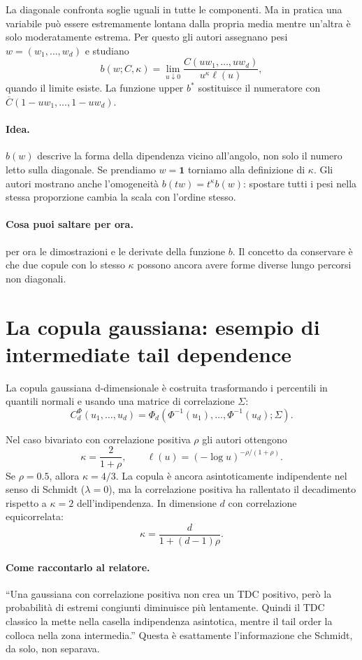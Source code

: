 \documentclass[11pt,a4paper]{article}
\newcommand{\one}{\boldsymbol{1}}
\newcommand{\Idea}{\paragraph{Idea.}}
\newcommand{\Salta}{\paragraph{Cosa puoi saltare per ora.}}
\begin{document}
La diagonale confronta soglie uguali in tutte le componenti. Ma in pratica
una variabile può essere estremamente lontana dalla propria media mentre
un'altra è solo moderatamente estrema. Per questo gli autori assegnano pesi
$w=(w_1,\ldots,w_d)$ e studiano
\begin{equation}
 b(w;C,\kappa)=\lim_{u\downarrow0}
 \frac{C(uw_1,\ldots,uw_d)}{u^\kappa\ell(u)},
 \label{eq:order-function}
\end{equation}
quando il limite esiste. La funzione upper $b^*$ sostituisce il numeratore con
$\overline C(1-uw_1,\ldots,1-uw_d)$.

\Idea $b(w)$ descrive la forma della dipendenza vicino all'angolo, non solo il
numero letto sulla diagonale. Se prendiamo $w=\one$ torniamo alla definizione
di $\kappa$. Gli autori mostrano anche l'omogeneità $b(tw)=t^\kappa b(w)$:
spostare tutti i pesi nella stessa proporzione cambia la scala con l'ordine
stesso.

\Salta per ora le dimostrazioni e le derivate della funzione $b$. Il concetto
da conservare è che due copule con lo stesso $\kappa$ possono ancora avere
forme diverse lungo percorsi non diagonali.

\section{La copula gaussiana: esempio di intermediate tail dependence}

La copula gaussiana d-dimensionale è costruita trasformando i percentili in
quantili normali e usando una matrice di correlazione $\Sigma$:
\begin{equation}
 C_d^\Phi(u_1,\ldots,u_d)=
 \Phi_d\!\left(\Phi^{-1}(u_1),\ldots,\Phi^{-1}(u_d);\Sigma\right).
 \label{eq:gaussian-copula}
\end{equation}

Nel caso bivariato con correlazione positiva $\rho$ gli autori ottengono
\begin{equation}
 \kappa=\frac{2}{1+\rho},
 \qquad
 \ell(u)=(-\log u)^{-\rho/(1+\rho)}.
 \label{eq:gaussian-order}
\end{equation}
Se $\rho=0.5$, allora $\kappa=4/3$. La copula è ancora asintoticamente
indipendente nel senso di Schmidt ($\lambda=0$), ma la correlazione positiva ha
rallentato il decadimento rispetto a $\kappa=2$ dell'indipendenza. In
dimensione $d$ con correlazione equicorrelata:
\[
 \kappa=\frac{d}{1+(d-1)\rho}.
\]

\paragraph{Come raccontarlo al relatore.}
``Una gaussiana con correlazione positiva non crea un TDC positivo, però la
probabilità di estremi congiunti diminuisce più lentamente. Quindi il TDC
classico la mette nella casella indipendenza asintotica, mentre il tail order
la colloca nella zona intermedia.'' Questa è esattamente l'informazione che
Schmidt, da solo, non separava.
\end{document}
